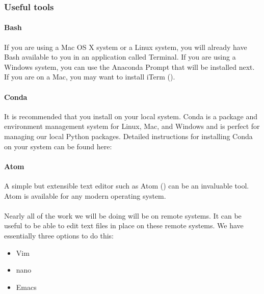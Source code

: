 \documentclass[letterpaper,10pt,english]{sphinxmanual}
\begin{document}
\subsubsection{Useful tools}
\label{\detokenize{01-amazon-web-services:Useful-tools}}

\paragraph{Bash}
\label{\detokenize{01-amazon-web-services:Bash}}
If you are using a Mac OS X system or a Linux system, you will already
have Bash available to you in an application called Terminal. If you are
using a Windows system, you can use the Anaconda Prompt that will be
installed next. If you are on a Mac, you may want to install iTerm
().


\paragraph{Conda}
\label{\detokenize{01-amazon-web-services:Conda}}
It is recommended that you install  on your
local system. Conda is a package and environment management system for
Linux, Mac, and Windows and is perfect for managing our local Python
packages. Detailed instructions for installing Conda on your system can
be found here: 


\paragraph{Atom}
\label{\detokenize{01-amazon-web-services:Atom}}
A simple but extensible text editor such as Atom () can
be an invaluable tool. Atom is available for any modern operating
system.


\paragraph{}
\label{\detokenize{01-amazon-web-services:vim}}
Nearly all of the work we will be doing will be on remote systems. It
can be useful to be able to edit text files in place on these remote
systems. We have essentially three options to do this:
\begin{itemize}
\item {} 
Vim

\item {} 
nano

\item {} 
Emacs

\end{itemize}
\end{document}
